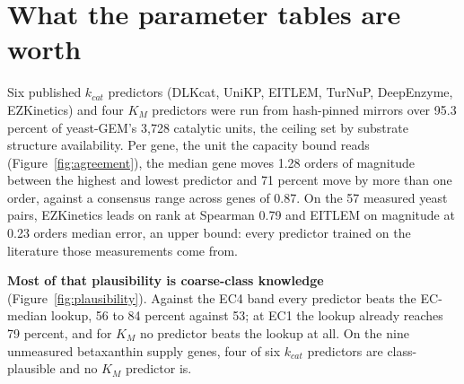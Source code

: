 
\section{What the parameter tables are worth}
\label{sec:parameters}

Six published $k_{cat}$ predictors (DLKcat, UniKP, EITLEM, TurNuP, DeepEnzyme, EZKinetics)
and four $K_M$ predictors were run from hash-pinned mirrors over 95.3 percent of yeast-GEM's
3{,}728 catalytic units, the ceiling set by substrate structure availability. Per gene, the
unit the capacity bound reads (Figure~\ref{fig:agreement}), the median gene moves 1.28
orders of magnitude between the highest and lowest predictor and 71 percent move by more
than one order, against a consensus range across genes of 0.87. On the 57 measured yeast
pairs, EZKinetics leads on rank at Spearman
0.79 and EITLEM on magnitude at 0.23 orders median error, an upper bound: every predictor
trained on the literature those measurements come from.


\textbf{Most of that plausibility is coarse-class knowledge} (Figure~\ref{fig:plausibility}).
Against the EC4 band every predictor beats the EC-median lookup, 56 to 84 percent against
53; at EC1 the lookup already reaches 79 percent, and for $K_M$ no predictor beats the
lookup at all. On the nine unmeasured betaxanthin supply genes, four of six $k_{cat}$
predictors are class-plausible and no $K_M$ predictor is.


